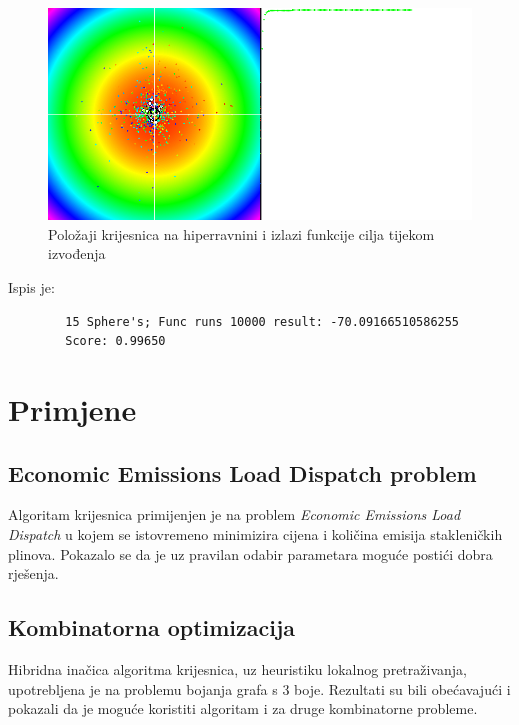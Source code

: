 \begin{figure}[H]
	\centering
	\includegraphics[width=14cm]{mt62}
	\caption{Položaji krijesnica na hiperravnini i izlazi funkcije cilja tijekom izvođenja}
	\centering
\end{figure}

\noindent Ispis je:
\begin{framed}
	\begin{verbatim}
		15 Sphere's; Func runs 10000 result: -70.09166510586255
		Score: 0.99650
	\end{verbatim}
\end{framed}



\section{Primjene}

\subsection{Economic Emissions Load Dispatch problem}
Algoritam krijesnica primijenjen je na problem \textit{Economic Emissions Load Dispatch} u kojem se istovremeno minimizira cijena i količina emisija stakleničkih plinova.\cite{Apostolopoulos2010} Pokazalo se da je uz pravilan odabir parametara moguće postići dobra rješenja.

\subsection{Kombinatorna optimizacija}
Hibridna inačica algoritma krijesnica, uz heuristiku lokalnog pretraživanja, upotrebljena je na problemu bojanja grafa s 3 boje.\cite{fister2012memetic} Rezultati su bili obećavajući i pokazali da je moguće koristiti algoritam i za druge kombinatorne probleme.


